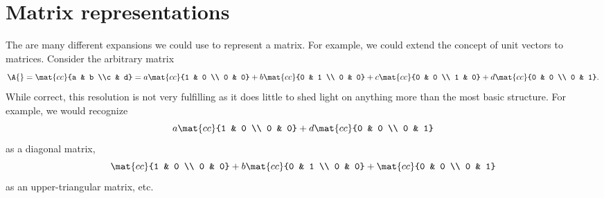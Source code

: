 \section{Matrix representations}
The are many different expansions we could use to represent a matrix. For example, we could extend the concept of unit vectors to matrices. Consider the arbitrary matrix
\begin{equation}
  \A{} = 
  \mat{cc}{a & b \\c & d} = 
  a \mat{cc}{1 & 0 \\ 0 & 0} +
  b \mat{cc}{0 & 1 \\ 0 & 0} +
  c \mat{cc}{0 & 0 \\ 1 & 0} +
  d \mat{cc}{0 & 0 \\ 0 & 1}.
\end{equation}
While correct, this resolution is not very fulfilling as it does little to shed light on anything more than the most basic structure. For example, we would recognize
\begin{equation}
  a \mat{cc}{1 & 0 \\ 0 & 0} +
  d \mat{cc}{0 & 0 \\ 0 & 1}
\end{equation}
as a diagonal matrix,
\begin{equation}
    \mat{cc}{1 & 0 \\ 0 & 0} +
  b \mat{cc}{0 & 1 \\ 0 & 0} +
    \mat{cc}{0 & 0 \\ 0 & 1}
\end{equation}
as an upper-triangular matrix, etc.

